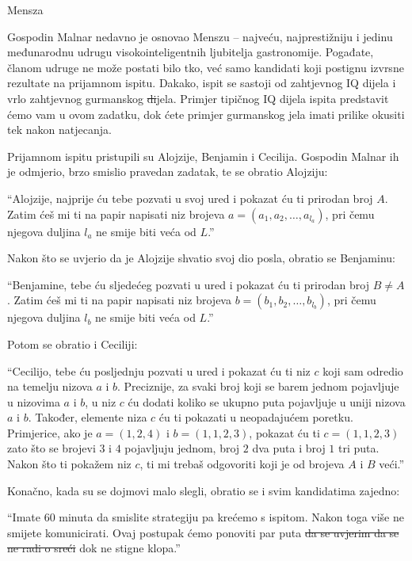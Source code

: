 \begin{statement}[
  problempoints=100,
  timelimit=1 sekunda,
  memorylimit=512 MiB,
]{Mensza}

Gospodin Malnar nedavno je osnovao Menszu -- najveću, najprestižniju i jedinu
međunarodnu udrugu visokointeligentnih ljubitelja gastronomije. Pogađate, članom
udruge ne može postati bilo tko, već samo kandidati koji postignu izvrsne
rezultate na prijamnom ispitu. Dakako, ispit se sastoji od zahtjevnog IQ dijela
i vrlo zahtjevnog gurmanskog \sout{di}jela. Primjer tipičnog IQ dijela ispita
predstavit ćemo vam u ovom zadatku, dok ćete primjer gurmanskog jela imati
prilike okusiti tek nakon natjecanja.

Prijamnom ispitu pristupili su Alojzije, Benjamin i Cecilija. Gospodin Malnar
ih je odmjerio, brzo smislio pravedan zadatak, te se obratio Alojziju:

``Alojzije, najprije ću tebe pozvati u svoj ured i pokazat ću ti prirodan
  broj $A$.  Zatim ćeš mi ti na papir napisati niz brojeva $a = (a_1, a_2,
\ldots, a_{l_a})$, pri čemu njegova duljina $l_a$ ne smije biti veća od $L$.''

Nakon što se uvjerio da je Alojzije shvatio svoj dio posla, obratio se Benjaminu:

``Benjamine, tebe ću sljedećeg pozvati u ured i pokazat ću ti prirodan
  broj $B \ne A$.  Zatim ćeš mi ti na papir napisati niz brojeva $b = (b_1, b_2,
\ldots, b_{l_b})$, pri čemu njegova duljina $l_b$ ne smije biti veća od $L$.''

Potom se obratio i Ceciliji:

``Cecilijo, tebe ću posljednju pozvati u ured i pokazat ću ti niz $c$ koji
sam odredio na temelju nizova $a$ i $b$. Preciznije, za svaki broj koji se barem
jednom pojavljuje u nizovima $a$ i $b$, u niz $c$ ću dodati koliko se ukupno puta
pojavljuje u uniji nizova $a$ i $b$. Također, elemente niza $c$ ću ti pokazati u
neopadajućem poretku. Primjerice, ako je $a = (1, 2, 4)$ i $b = (1, 1, 2, 3)$,
pokazat ću ti $c = (1, 1, 2, 3)$ zato što se brojevi $3$ i $4$ pojavljuju jednom,
broj $2$ dva puta i broj $1$ tri puta. Nakon što ti pokažem niz $c$, ti mi trebaš
odgovoriti koji je od brojeva $A$ i $B$ veći.''

Konačno, kada su se dojmovi malo slegli, obratio se i svim kandidatima zajedno:

``Imate 60 minuta da smislite strategiju pa krećemo s ispitom. Nakon toga
više ne smijete komunicirati. Ovaj postupak ćemo ponoviti par puta
\sout{da se uvjerim da se ne radi o sreći} dok ne stigne klopa.''


\end{statement}
